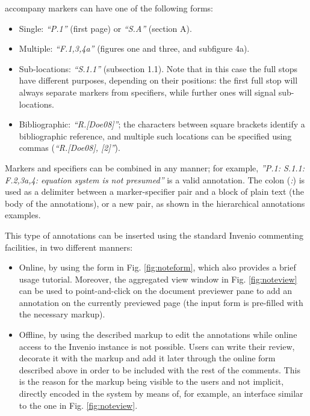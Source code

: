 accompany markers can have one of the following forms:
\begin{itemize}
  \item Single: \textit{``P.1''} (first page) or \textit{``S.A''} (section A).
  \item Multiple: \textit{``F.1,3,4a''} (figures one and three, and subfigure 4a).
  \item Sub-locations: \textit{``S.1.1''} (subsection 1.1). Note that in this
                       case the full stops have different purposes, depending on
                       their positions: the first full stop will always separate
                       markers from specifiers, while further ones will signal
                       sub-locations.
  \item Bibliographic: \textit{``R.[Doe08]''}; the characters between square
                       brackets identify a bibliographic reference, and multiple
                       such locations can be specified using commas
                       (\textit{``R.[Doe08], [2]''}).
\end{itemize}

Markers and specifiers can be combined in any manner; for example,
\textit{''P.1: S.1.1: F.2,3a,4: equation system is not presumed''} is a valid
annotation.  The colon (\textit{:}) is used as a delimiter between a
marker-specifier pair and a block of plain text (the body of the annotations),
or a new pair, as shown in the hierarchical annotations examples.

This type of annotations can be inserted using the standard Invenio
commenting facilities, in two different manners:

\begin{itemize}
  \item Online, by using the form in Fig. \ref{fig:noteform}, which also
        provides a brief usage tutorial. Moreover, the aggregated view window in
        Fig. \ref{fig:noteview} can be used to point-and-click on the document
        previewer pane to add an annotation on the currently previewed page (the
        input form is pre-filled with the necessary markup).
  \item Offline, by using the described markup to edit the annotations while
        online access to the Invenio instance is not possible. Users can write
        their review, decorate it with the markup and add it later through the
        online form described above in order to be included with the rest of the
        comments. This is the reason for the markup being visible to the users
        and not implicit, directly encoded in the system by means of, for
        example, an interface similar to the one in Fig. \ref{fig:noteview}.
\end{itemize}

